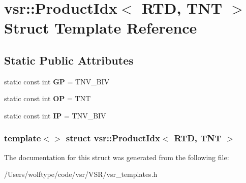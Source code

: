 \hypertarget{structvsr_1_1_product_idx_3_01_r_t_d_00_01_t_n_t_01_4}{\section{vsr\-:\-:Product\-Idx$<$ R\-T\-D, T\-N\-T $>$ Struct Template Reference}
\label{structvsr_1_1_product_idx_3_01_r_t_d_00_01_t_n_t_01_4}
}
\subsection*{Static Public Attributes}
\begin{DoxyCompactItemize}
\item 
\hypertarget{structvsr_1_1_product_idx_3_01_r_t_d_00_01_t_n_t_01_4_ad9cc858205bacb2139ffa31d68e7b697}{static const int {\bfseries G\-P} = T\-N\-V\-\_\-\-B\-I\-V}\label{structvsr_1_1_product_idx_3_01_r_t_d_00_01_t_n_t_01_4_ad9cc858205bacb2139ffa31d68e7b697}

\item 
\hypertarget{structvsr_1_1_product_idx_3_01_r_t_d_00_01_t_n_t_01_4_af171a9c4f5e2a6a5f9dd06bf0af68f54}{static const int {\bfseries O\-P} = T\-N\-T}\label{structvsr_1_1_product_idx_3_01_r_t_d_00_01_t_n_t_01_4_af171a9c4f5e2a6a5f9dd06bf0af68f54}

\item 
\hypertarget{structvsr_1_1_product_idx_3_01_r_t_d_00_01_t_n_t_01_4_ae6680862416f1c76c46de85dab18b2d5}{static const int {\bfseries I\-P} = T\-N\-V\-\_\-\-B\-I\-V}\label{structvsr_1_1_product_idx_3_01_r_t_d_00_01_t_n_t_01_4_ae6680862416f1c76c46de85dab18b2d5}

\end{DoxyCompactItemize}
\subsubsection*{template$<$$>$ struct vsr\-::\-Product\-Idx$<$ R\-T\-D, T\-N\-T $>$}



The documentation for this struct was generated from the following file\-:\begin{DoxyCompactItemize}
\item 
/\-Users/wolftype/code/vsr/\-V\-S\-R/vsr\-\_\-templates.\-h\end{DoxyCompactItemize}
